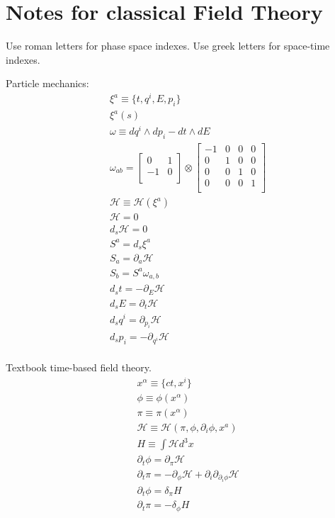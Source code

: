 \documentclass[aps,pra,10pt,twocolumn,floatfix,nofootinbib]{revtex4-1}
\theoremstyle{definition}
\begin{document}
\section{Notes for classical Field Theory}

Use roman letters for phase space indexes. Use greek letters for space-time indexes.

Particle mechanics:
\begin{align*}
&\xi^a\equiv\{t, q^i, E, p_i\} \\
&\xi^a(s)\\
&\omega \equiv  dq^i \wedge dp_i - dt \wedge dE \\
&\omega_{ab} =  \left[
  \begin{array}{cc}
    0 & 1 \\
    -1 & 0 \\
  \end{array}
\right] \otimes \left[
  \begin{array}{cccc}
    -1 & 0 & 0 & 0\\
    0 & 1 & 0 & 0\\
    0 & 0 & 1 & 0 \\
    0 & 0 & 0 & 1 \\
  \end{array}
\right] \\
&\mathcal{H}\equiv\mathcal{H}(\xi^a) \\
&\mathcal{H} = 0 \\
&d_s \mathcal{H} = 0 \\
&S^a=d_s\xi^a \\
&S_a = \partial_a\mathcal{H} \\
&S_b = S^a \omega_{a, b} \\
&d_{s}t = - \partial_{E} \mathcal{H} \\
&d_{s}E = \partial_{t} \mathcal{H} \\
&d_{s}q^i = \partial_{p_i} \mathcal{H} \\
&d_{s}p_i = - \partial_{q^i} \mathcal{H} \\
\end{align*}

Textbook time-based field theory.
\begin{align*}
&x^\alpha\equiv\{ct, x^i\} \\
&\phi\equiv\phi(x^\alpha) \\
&\pi\equiv\pi(x^\alpha) \\
&\mathcal{H}\equiv\mathcal{H}(\pi, \phi, \partial_i\phi, x^a) \\
&H\equiv \int \mathcal{H} d^3x \\
&\partial_{t}\phi = \partial_{\pi} \mathcal{H} \\
&\partial_{t}\pi = - \partial_{\phi} \mathcal{H} + \partial_i \partial_{\partial_i\phi} \mathcal{H} \\
&\partial_{t}\phi = \delta_{\pi} H \\
&\partial_{t}\pi = - \delta_{\phi} H \\
\end{align*}
\end{document}
